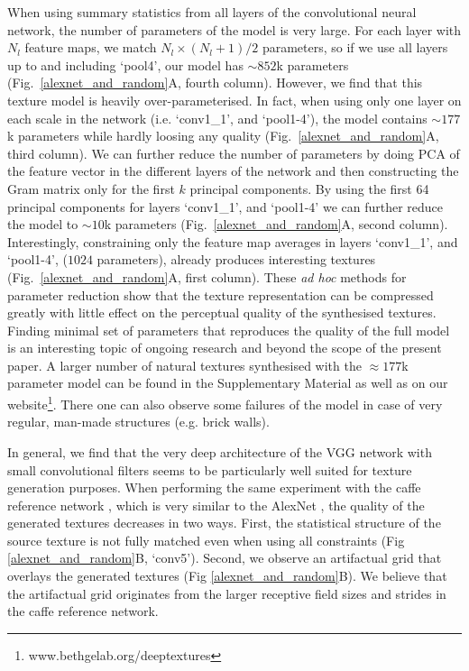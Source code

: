 \documentclass{article} %
\begin{document}
When using summary statistics from all layers of the convolutional neural network, the number of parameters of the model is very large. For each layer with $N_l$ feature maps, we match $N_l\times(N_l + 1)/2$ parameters, so if we use all layers up to and including `pool4', our model has $\sim 852$k parameters (Fig.~\ref{alexnet_and_random}A, fourth column). However, we find that this texture model is heavily over-parameterised. In fact, when using only one layer on each scale in the network (i.e. `conv1\_1', and `pool1-4'), the model contains $\sim 177$k parameters while hardly loosing any quality (Fig.~\ref{alexnet_and_random}A, third column). We can further reduce the number of parameters by doing PCA of the feature vector in the different layers of the network and then constructing the Gram matrix only for the first $k$ principal components. By using the first 64 principal components for layers `conv1\_1', and `pool1-4' we can further reduce the model to $\sim 10$k parameters (Fig.~\ref{alexnet_and_random}A, second column). Interestingly, constraining only the feature map averages in layers `conv1\_1', and `pool1-4',  ($1024$ parameters), already produces interesting textures (Fig.~\ref{alexnet_and_random}A, first column). These \emph{ad hoc} methods for parameter reduction show that the texture representation can be compressed greatly with little effect on the perceptual quality of the synthesised textures. Finding minimal set of parameters that reproduces the quality of the full model is an interesting topic of ongoing research and beyond the scope of the present paper. A larger number of natural textures synthesised with the $\approx 177$k parameter model can be found in the Supplementary Material as well as on our website\footnote{www.bethgelab.org/deeptextures}. There one can also observe some failures of the model in case of very regular, man-made structures (e.g. brick walls).

In general, we find that the very deep architecture of the VGG network with small convolutional filters seems to be particularly well suited for texture generation purposes. When performing the same experiment with the caffe reference network \cite{jia_caffe:_2014}, which is very similar to the AlexNet  \cite{krizhevsky_imagenet_2012}, the quality of the generated textures decreases in two ways. First, the statistical structure of the source texture is not fully matched even when using all constraints (Fig \ref{alexnet_and_random}B, `conv5'). Second, we observe an artifactual grid that overlays the generated textures (Fig \ref{alexnet_and_random}B). We believe that the artifactual grid originates from the larger receptive field sizes and strides in the caffe reference network.
\end{document}
